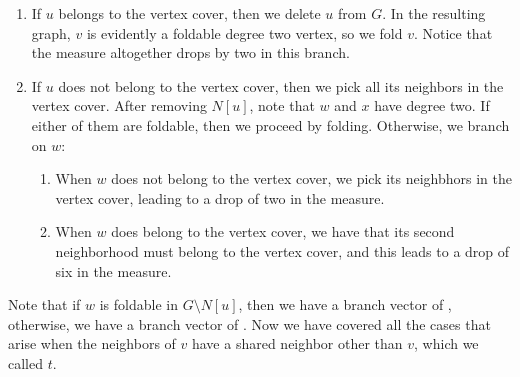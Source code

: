 \documentclass[svgnames]{llncs}
\newcommand{\branchvector}[1]{{\color{IndianRed}{$(#1)$}}}
\begin{document}
{\begin{enumerate}
\item If $u$ belongs to the vertex cover, then we delete $u$ from $G$. In the resulting graph, $v$ is evidently a foldable degree two vertex, so we fold $v$. Notice that the measure altogether drops by two in this branch.
\item If $u$ does not belong to the vertex cover, then we pick all its neighbors in the vertex cover. After removing $N[u]$, note that $w$ and $x$ have degree two. If either of them are foldable, then we proceed by folding. Otherwise, we branch on $w$:
\begin{enumerate}
\item When $w$ does not belong to the vertex cover, we pick its neighbhors in the vertex cover, leading to a drop of two in the measure.
\item When $w$ does belong to the vertex cover, we have that its second neighborhood must belong to the vertex cover, and this leads to a drop of six in the measure.
\end{enumerate}
\end{enumerate}

Note that if $w$ is foldable in $G \setminus N[u]$, then we have a branch vector of \branchvector{2,5}, otherwise, we have a branch vector of \branchvector{2,6,10}. Now we have covered all the cases that arise when the neighbors of $v$ have a shared neighbor other than $v$, which we called $t$.



\begin{figure}[ht]
\centering
\begin{minipage}[c]{0.45\linewidth}
\end{minipage}
\end{figure}}
\end{document}
